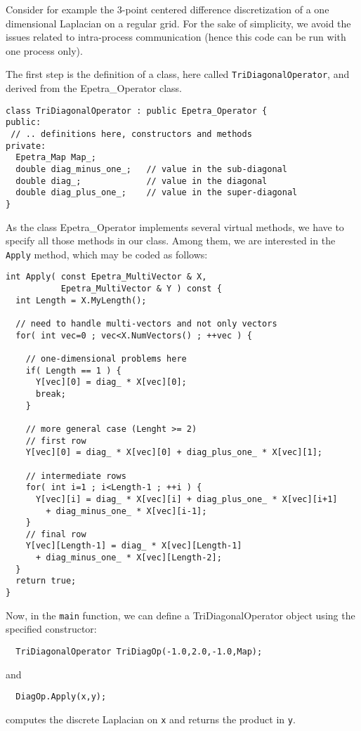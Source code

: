 Consider for example the 3-point centered difference discretization of a
one dimensional Laplacian on a regular grid. For the sake of simplicity,
we avoid the issues related to intra-process communication (hence this
code can be run with one process only).

The first step is the definition of a class, here called
\verb!TriDiagonalOperator!, and derived from the Epetra\_Operator class.
\begin{verbatim}
class TriDiagonalOperator : public Epetra_Operator {
public:
 // .. definitions here, constructors and methods
private:
  Epetra_Map Map_;
  double diag_minus_one_;   // value in the sub-diagonal
  double diag_;             // value in the diagonal
  double diag_plus_one_;    // value in the super-diagonal
}
\end{verbatim}
As the class  Epetra\_Operator implements several virtual methods, we
have to specify all those methods in our class. Among them, we are
interested in the \verb!Apply! method, which may be coded as follows:
\begin{verbatim}
int Apply( const Epetra_MultiVector & X, 
           Epetra_MultiVector & Y ) const {
  int Length = X.MyLength();
  
  // need to handle multi-vectors and not only vectors
  for( int vec=0 ; vec<X.NumVectors() ; ++vec ) {
    
    // one-dimensional problems here
    if( Length == 1 ) {
      Y[vec][0] = diag_ * X[vec][0];
      break;
    }
    
    // more general case (Lenght >= 2)
    // first row
    Y[vec][0] = diag_ * X[vec][0] + diag_plus_one_ * X[vec][1];
    
    // intermediate rows
    for( int i=1 ; i<Length-1 ; ++i ) {
      Y[vec][i] = diag_ * X[vec][i] + diag_plus_one_ * X[vec][i+1]
        + diag_minus_one_ * X[vec][i-1];
    }
    // final row
    Y[vec][Length-1] = diag_ * X[vec][Length-1]
      + diag_minus_one_ * X[vec][Length-2];
  }
  return true;
}
\end{verbatim}
Now, in the \verb!main! function, we can define a TriDiagonalOperator object
using the specified constructor:
\begin{verbatim}
  TriDiagonalOperator TriDiagOp(-1.0,2.0,-1.0,Map);
\end{verbatim}
and
\begin{verbatim}
  DiagOp.Apply(x,y);
\end{verbatim}
computes the discrete Laplacian on \verb!x! and returns the product in
\verb!y!. 

